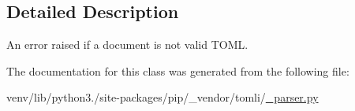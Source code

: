 \subsection{Detailed Description}
\begin{DoxyVerb}An error raised if a document is not valid TOML.\end{DoxyVerb}
 

The documentation for this class was generated from the following file\+:\begin{DoxyCompactItemize}
\item 
venv/lib/python3./site-\/packages/pip/\+\_\+vendor/tomli/\hyperlink{pip_2__vendor_2tomli_2__parser_8py}{\+\_\+parser.\+py}\end{DoxyCompactItemize}
